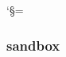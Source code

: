 \documentclass[aspectratio=169]{beamer}
\begin{document}
\catcode`§=\active

\begin{frame}\frametitle{sandbox}
  
\end{frame}
\end{document}
